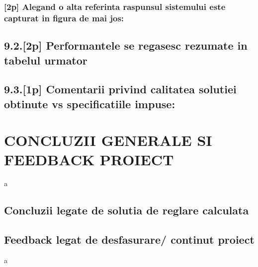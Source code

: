 \documentclass[12pt,english]{article}
\begin{document}
\subsubsection { [2p] Alegand o alta referinta raspunsul sistemului este capturat in figura de mai jos: }
\subsection { 9.2.[2p] Performantele se regasesc rezumate in tabelul urmator }
\subsection { 9.3.[1p] Comentarii privind calitatea solutiei obtinute vs specificatiile impuse: }

\section { CONCLUZII GENERALE SI FEEDBACK PROIECT }
a
\subsection { Concluzii legate de solutia de reglare calculata }
\subsection { Feedback legat de desfasurare/ continut proiect }

a
\end{document}
